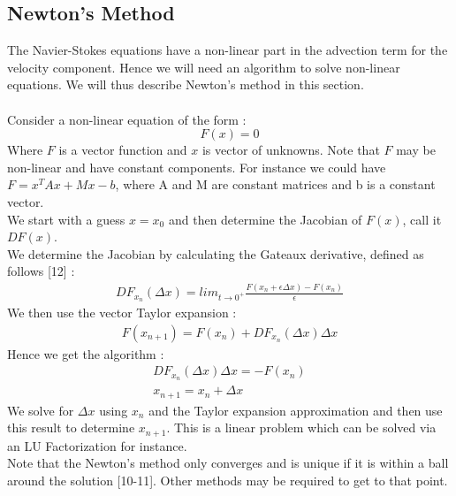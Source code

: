 \documentclass[11pt,twoside,a4paper]{article}
\begin{document}
\subsection{Newton's Method}
The Navier-Stokes equations have a non-linear part in the advection term for the velocity component. Hence we will need an algorithm to solve non-linear equations. We will thus describe Newton's method in this section.\\
\\
Consider a non-linear equation of the form :
$$
F(x) = 0
$$
Where $F$ is a vector function and $x$ is vector of unknowns. Note that $F$ may be non-linear and have constant components.
For instance we could have $ F = x^T A x + M x - b$, where A and M are constant matrices and b is a constant vector.\\
We start with a guess $x = x_0$ and then determine the Jacobian of $F(x)$, call it $DF(x)$.\\
We determine the Jacobian by calculating the Gateaux derivative, defined as follows [12] :
\begin{align}
DF_{x_n}(\Delta x) = lim_{t \rightarrow 0^+} \frac{F(x_n+ \epsilon \Delta x) - F(x_n)}{\epsilon}
\end{align}
We then use the vector Taylor expansion :
\begin{align*}
F(x_{n+1}) = F(x_n) + DF_{x_n}(\Delta x) \Delta x
\end{align*}
Hence we get the algorithm :
\begin{align}
DF_{x_n}(\Delta x) \Delta x = - F(x_n)\\
x_{n+1} = x_n + \Delta x
\end{align}
We solve for $\Delta x$ using $x_n$ and the Taylor expansion approximation and then use this result to determine $x_{n+1}$.
This is a linear problem which can be solved via an LU Factorization for instance.\\
Note that the Newton's method only converges and is unique if it is within a ball around the solution [10-11]. Other methods may be required to get to that point.
\end{document}
